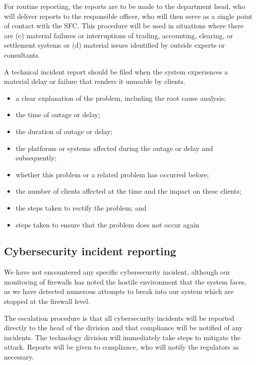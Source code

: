 For routine reporting, the reports are to be made to the department
head, who will deliver reports to the responsible officer, who will
then serve as a single point of contact with the SFC.  This procedure
will be used in situations where there are (c) material failures or
interruptions of trading, accounting, clearing, or settlement systems
or (d) material issues identified by outside experts or consultants.

A technical incident report should be filed when the system
experiences a material delay or failure that renders it unusable by
clients.

\begin{itemize}
\item a clear explanation of the problem, including the root cause analysis;
\item the time of outage or delay;
\item the duration of outage or delay;
\item the platforms or systems affected during the outage or delay and subsequently;
\item whether this problem or a related problem has occurred before;
\item the number of clients affected at the time and the impact on these clients;
\item the steps taken to rectify the problem; and
\item steps taken to ensure that the problem does not occur again
\end{itemize}


\subsection{Cybersecurity incident reporting}

We have not encountered any specific cybersecurity incident, although
our monitoring of firewalls has noted the hostile environment that
the system faces, as we have detected numerous attempts to break into our
system which are stopped at the firewall level.

The escalation procedure is that all cybersecurity incidents will be
reported directly to the head of the division and that compliance will
be notified of any incidents.  The technology division will immediately
take steps to mitigate the attack.  Reports will be given to
compliance, who will notify the regulators as necessary.

